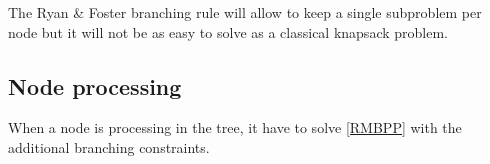 The Ryan \& Foster branching rule will allow to keep a single subproblem per node but it will not be as easy to solve as a classical knapsack problem.

\subsection{Node processing}

When a node is processing in the tree, it have to solve \eqref{RMBPP} with the additional branching constraints.
